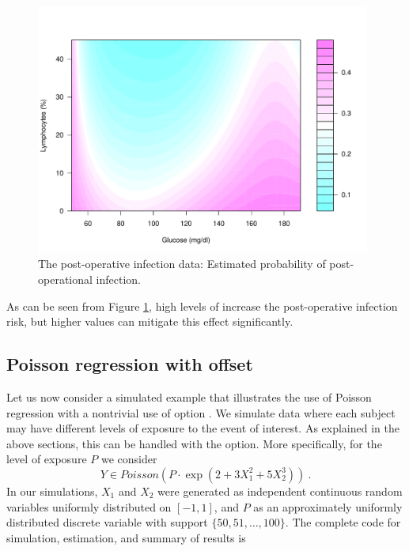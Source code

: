 \begin{figure}[htb]
\centering
\includegraphics[width=11cm]{Infec_Plot_3.pdf}  \vspace{-0.5cm}
\caption{The post-operative infection data: Estimated probability of post-operational infection.  \label{fig-ipo2} }
\end{figure}

As can be seen from Figure \ref{fig-ipo2}, high levels of   increase the post-operative infection risk, but higher   values can mitigate this effect significantly.  



\subsection{Poisson regression with offset}\label{subsec-PoissExample}

Let us now consider a simulated example that illustrates the use of Poisson regression with a nontrivial use of option  .
We simulate data where each subject may have different levels of exposure to the event of interest.
As explained in the above sections, this can be handled with the   option. More specifically, for the level of exposure $P$ we consider 
\[
Y\in Poisson \left( { P \cdot \exp \left({ 2+ 3X_1^2+5X_2^3 }\right) }\right) \ .
\]
In our simulations, $X_1$ and $X_2$ were generated as independent continuous random variables uniformly distributed on $[-1,1]$, and $P$ as an approximately uniformly distributed discrete variable with support $\{50,51,\ldots ,100\}$.
The complete code for simulation, estimation, and summary of results is 

